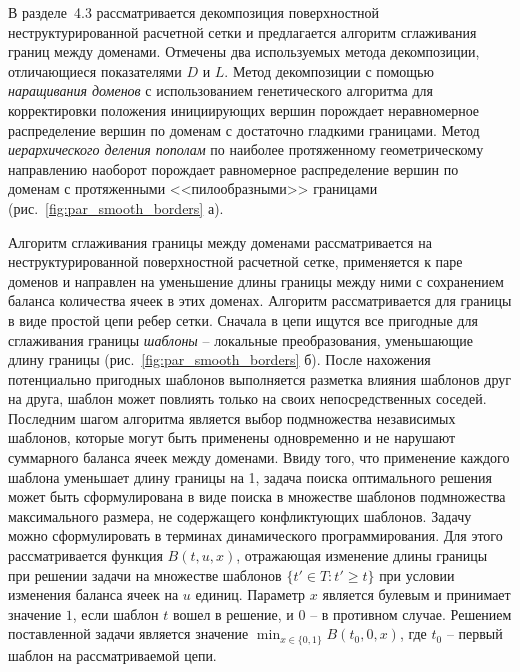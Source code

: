 \documentclass[a4paper,14pt]{extarticle}                     %
\theoremstyle{plain}                                         %
\begin{document}

В разделе~4.3 рассматривается декомпозиция поверхностной неструктурированной расчетной сетки и предлагается алгоритм сглаживания границ между доменами.
Отмечены два используемых метода декомпозиции, отличающиеся показателями $D$ и $L$.
Метод декомпозиции с помощью \textit{наращивания доменов} с использованием генетического алгоритма для корректировки положения инициирующих вершин порождает неравномерное распределение вершин по доменам с достаточно гладкими границами.
Метод \textit{иерархического деления пополам} по наиболее протяженному геометрическому направлению наоборот порождает равномерное распределение вершин по доменам с протяженными <<пилообразными>> границами (рис.~\ref{fig:par_smooth_borders} а).

Алгоритм сглаживания границы между доменами рассматривается на неструктурированной поверхностной расчетной сетке, применяется к паре доменов и направлен на уменьшение длины границы между ними с сохранением баланса количества ячеек в этих доменах.
Алгоритм рассматривается для границы в виде простой цепи ребер сетки.
Сначала в цепи ищутся все пригодные для сглаживания границы \textit{шаблоны} -- локальные преобразования, уменьшающие длину границы (рис.~\ref{fig:par_smooth_borders} б).
После нахожения потенциально пригодных шаблонов выполняется разметка влияния шаблонов друг на друга, шаблон может повлиять только на своих непосредственных соседей.
Последним шагом алгоритма является выбор подмножества независимых шаблонов, которые могут быть применены одновременно и не нарушают суммарного баланса ячеек между доменами.
Ввиду того, что применение каждого шаблона уменьшает длину границы на 1, задача поиска оптимального решения может быть сформулирована в виде поиска в множестве шаблонов подмножества максимального размера, не содержащего конфликтующих шаблонов.
Задачу можно сформулировать в терминах динамического программирования.
Для этого рассматривается функция $B(t, u, x)$, отражающая изменение длины границы при решении задачи на множестве шаблонов $\{ t' \in T : t' \ge t \}$ при условии изменения баланса ячеек на $u$ единиц.
Параметр $x$ является булевым и принимает значение $1$, если шаблон $t$ вошел в решение, и $0$ -- в противном случае.
Решением поставленной задачи является значение $\min_{x \in \{0, 1\}}{B(t_0, 0, x)}$, где $t_0$ -- первый шаблон на рассматриваемой цепи.
\end{document}
